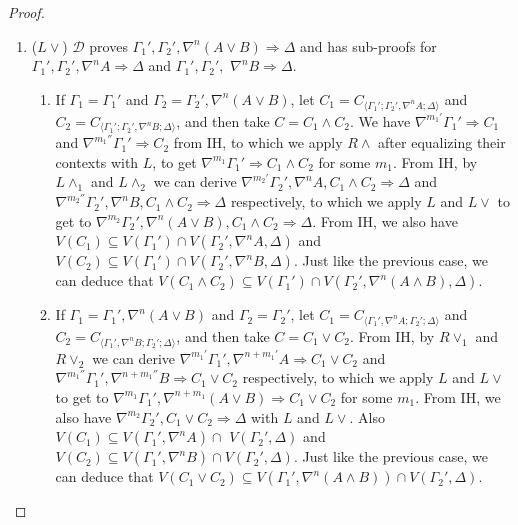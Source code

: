 \begin{proof}
\begin{enumerate}
		\item ($L\lor$) $\mathcal{D}$ proves $\Gamma_1' , \Gamma_2' , \nabla^n (A \lor B) \Rightarrow \Delta$ and has sub-proofs for $\Gamma_1' , \Gamma_2' , \nabla^n A \Rightarrow \Delta$ and $\Gamma_1' , \Gamma_2' ,$ $\nabla^n B \Rightarrow \Delta$.
		\begin{enumerate}
			\item If $\Gamma_1 = \Gamma_1'$ and $\Gamma_2 = \Gamma_2' , \nabla^n (A \lor B)$, let $C_1 = C_{\langle\Gamma_1';\Gamma_2',\nabla^n A;\Delta\rangle}$ and $C_2 = C_{\langle\Gamma_1';\Gamma_2',\nabla^n B;\Delta\rangle}$, and then take $C = C_1 \land C_2$.
			We have $\nabla^{m_1'} \Gamma_1' \Rightarrow C_1$ and $\nabla^{m_1''} \Gamma_1' \Rightarrow C_2$ from IH, to which we apply $R\land$ after equalizing their contexts with $L$, to get $\nabla^{m_1} \Gamma_1' \Rightarrow C_1 \land C_2$ for some $m_1$.
			From IH, by $L\land_1$ and $L\land_2$ we can derive $\nabla^{m_2'}\Gamma_2' , \nabla^n A , C_1 \land C_2 \Rightarrow \Delta$ and $\nabla^{m_2''} \Gamma_2' , \nabla^n B , C_1 \land C_2 \Rightarrow \Delta$ respectively, to which we apply $L$ and $L\lor$ to get to $\nabla^{m_2} \Gamma_2' , \nabla^n (A \lor B) , C_1 \land C_2 \Rightarrow \Delta$.
			From IH, we also have $V(C_1) \subseteq V(\Gamma_1') \cap V(\Gamma_2' , \nabla^n A , \Delta)$ and $V(C_2) \subseteq V(\Gamma_1') \cap V(\Gamma_2' , \nabla^n B , \Delta)$. Just like the previous case, we can deduce that $V(C_1 \land C_2) \subseteq V(\Gamma_1') \cap V(\Gamma_2' , \nabla^n (A \land B) , \Delta)$.

			\item If $\Gamma_1 = \Gamma_1' , \nabla^n (A \lor B)$ and $\Gamma_2 = \Gamma_2'$, let $C_1 = C_{\langle\Gamma_1',\nabla^n A;\Gamma_2';\Delta\rangle}$ and $C_2 = C_{\langle\Gamma_1',\nabla^n B;\Gamma_2';\Delta\rangle}$, and then take $C = C_1 \lor C_2$.
			From IH, by $R\lor_1$ and $R\lor_2$ we can derive $\nabla^{m_1'} \Gamma_1',\nabla^{n+m_1'} A \Rightarrow C_1 \lor C_2$ and $\nabla^{m_1''} \Gamma_1', \nabla^{n+m_1''} B \Rightarrow C_1 \lor C_2$ respectively, to which we apply $L$ and $L\vee$ to get to $\nabla^{m_1} \Gamma_1', \nabla^{n+m_1} (A \lor B) \Rightarrow C_1 \lor C_2$ for some $m_1$.
			From IH, we also have $\nabla^{m_2} \Gamma_2' , C_1 \lor C_2 \Rightarrow \Delta$ with $L$ and $L\lor$.
			Also $V(C_1) \subseteq V(\Gamma_1' , \nabla^n A) \cap$ $V(\Gamma_2' , \Delta)$ and $V(C_2) \subseteq V(\Gamma_1' , \nabla^n B) \cap V(\Gamma_2' , \Delta)$. Just like the previous case, we can deduce that $V(C_1 \lor C_2) \subseteq V(\Gamma_1' , \nabla^n (A \land B)) \cap V(\Gamma_2' , \Delta)$.
		\end{enumerate}


\end{enumerate}
\end{proof}

